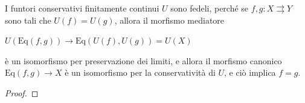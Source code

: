 \begin{theorem}\label{thm_yoneda_preserva_limiti}
\end{theorem}
\begin{theorem}\label{rep_preservano_lim}
\end{theorem}
\begin{theorem}
\end{theorem}
\begin{theorem}
\end{theorem}
\begin{corollary}
\end{corollary}
\begin{proposition}
 I funtori conservativi finitamente continui \(U\) sono fedeli, perché se \(f, g\colon X \rightrightarrows Y\) sono tali che \(U(f) = U(g)\), allora il morfismo mediatore

 \(U(\mathrm{Eq}(f, g)) \to \mathrm{Eq}(U(f), U(g)) = U(X)\)

 è un isomorfismo per preservazione dei limiti, e allora il morfismo canonico \(\mathrm{Eq}(f, g) \to X\) è un isomorfismo per la conservatività di \(U\), e ciò implica \(f = g\).
\end{proposition}
\begin{proof}
 \Todo{}
\end{proof}
\begin{definition}\label{def_teorie_prodotto}
 \Todo{}
\end{definition}

\begin{definition}\label{def_teorie_finlimite}
 \Todo{}
\end{definition}

\begin{theorem}\label{thm_yoneda_teorie_limite}
 \Todo{}
\end{theorem}

